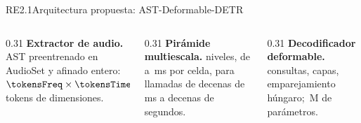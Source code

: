 \documentclass[aspectratio=169, 9pt]{beamer}
\newcommand{\valores}[1]{}
\begin{document}
\begin{frame}{RE2.1}{Arquitectura propuesta: AST-Deformable-DETR}
    \valores{RE_2-1}
    
    \centering
    \resizebox{0.86\linewidth}{!}{}
    \vspace{2ex}
    \begin{columns}[T]
        \begin{column}{0.31\textwidth}
            \textbf{Extractor de audio.} AST preentrenado en AudioSet y afinado entero:
            $\tokensFreq \times \tokensTime$ tokens de \hidden{} dimensiones.
        \end{column}
        \begin{column}{0.31\textwidth}
            \textbf{Pirámide multiescala.} \nLevels{} niveles, de \cellZero{} a
            \cellThree{}\,ms por celda, para llamadas de decenas de ms a decenas de segundos.
        \end{column}
        \begin{column}{0.31\textwidth}
            \textbf{Decodificador deformable.} \nQueries{} consultas, \nDecoderLayers{}
            capas, emparejamiento húngaro; \nParams{}\,M de parámetros.
        \end{column}
    \end{columns}
\end{frame}
\end{document}
